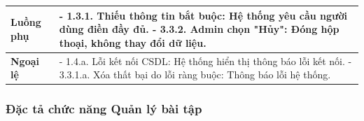 \documentclass[../main.tex]{subfiles}
\begin{document}
{\begin{tabularx}{\textwidth}{|p{3.5cm}|X|}
\hline
\textbf{Luồng phụ} & - 1.3.1. Thiếu thông tin bắt buộc: Hệ thống yêu cầu người dùng điền đầy đủ. \newline - 3.3.2. Admin chọn "Hủy": Đóng hộp thoại, không thay đổi dữ liệu. \\
\hline
\textbf{Ngoại lệ} & - 1.4.a. Lỗi kết nối CSDL: Hệ thống hiển thị thông báo lỗi kết nối. \newline - 3.3.1.a. Xóa thất bại do lỗi ràng buộc: Thông báo lỗi hệ thống. \\
\hline
\end{tabularx}
}

\subsubsection{Đặc tả chức năng Quản lý bài tập}
\end{document}
